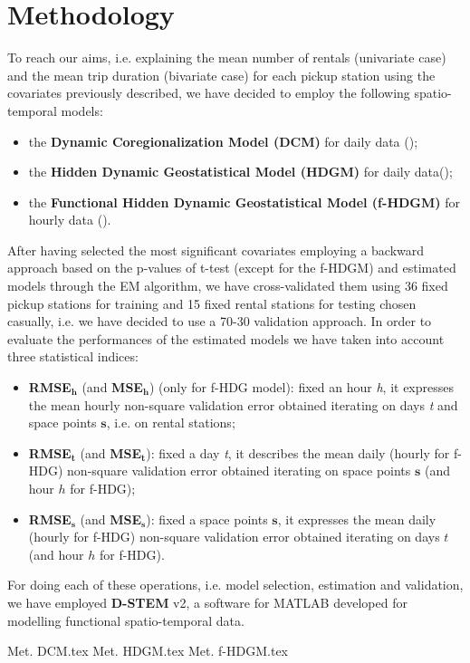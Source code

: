 \section{Methodology}
To reach our aims, i.e. explaining the mean number of rentals (univariate case) and the mean trip duration (bivariate case) for each pickup station using the covariates previously described, we have decided to employ the following spatio-temporal models:
\begin{itemize}
	\item the \textbf{Dynamic Coregionalization Model (DCM)} for daily data (\cite{dcm});
	\item the \textbf{Hidden Dynamic Geostatistical Model (HDGM)} for daily data(\cite{hdgm});
	\item the \textbf{Functional Hidden Dynamic Geostatistical Model (f-HDGM)} for hourly data (\cite{dstem}).
\end{itemize}
After having selected the most significant covariates employing a backward approach based on the p-values of t-test (except for the f-HDGM) and estimated models through the EM algorithm, we have cross-validated them using \num{36} fixed pickup stations for training and \num{15} fixed rental stations for testing chosen casually, i.e. we have decided to use a \num{70}-\num{30} validation approach. In order to evaluate the performances of the estimated models we have taken into account three statistical indices:
\begin{itemize}
	\item \textbf{RMSE}$\boldsymbol{_h}$ (and \textbf{MSE}$\boldsymbol{_h}$) (only for f-HDG model): fixed an hour \textit{h}, it expresses the mean hourly non-square validation error obtained iterating on days \textit{t} and space points $\boldsymbol{s}$, i.e. on rental stations;  
	\item \textbf{RMSE}$\boldsymbol{_t}$ (and \textbf{MSE}$\boldsymbol{_t}$): fixed a day \textit{t}, it describes the mean daily (hourly for f-HDG) non-square validation error obtained iterating on space points $\boldsymbol{s}$ (and hour $h$ for f-HDG);
	\item \textbf{RMSE}$\boldsymbol{_s}$ (and \textbf{MSE}$\boldsymbol{_s}$): fixed a space points $\boldsymbol{s}$, it expresses the mean daily (hourly for f-HDG) non-square validation error obtained iterating on days $t$ (and hour $h$ for f-HDG).
\end{itemize}For doing each of these operations, i.e. model selection, estimation and validation, we have employed \textbf{D-STEM} v\num{2}, a software for MATLAB developed for modelling functional spatio-temporal data.

{Met. DCM.tex}
{Met. HDGM.tex}
{Met. f-HDGM.tex}